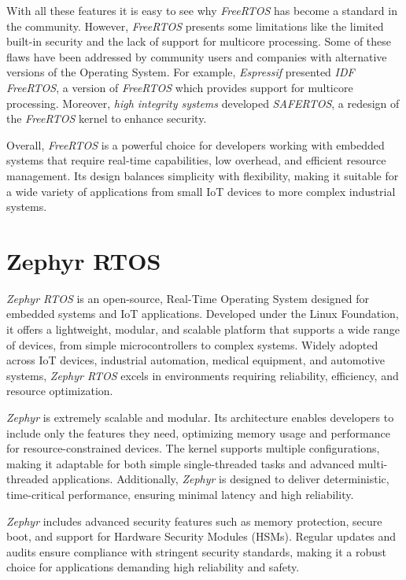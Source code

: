 With all these features it is easy to see why \textit{FreeRTOS} has become a standard
in the community. However, \textit{FreeRTOS} presents some limitations like the
limited built-in security and the lack of support for multicore processing. Some
of these flaws have been addressed by community users and companies with alternative
versions of the Operating System. For example, \textit{Espressif} presented
\textit{IDF FreeRTOS}\cite{idfrtos}, a version of \textit{FreeRTOS} which
provides support for multicore processing. Moreover, \textit{high integrity
systems} developed \textit{SAFERTOS}\cite{safertos}, a redesign of the \textit{FreeRTOS}
kernel to enhance security.

Overall, \textit{FreeRTOS} is a powerful choice for developers working with embedded
systems that require real-time capabilities, low overhead, and efficient resource
management. Its design balances simplicity with flexibility, making it suitable for
a wide variety of applications from small IoT devices to more complex industrial
systems.

\section{Zephyr RTOS}
\label{sec:rtos_zephyr}

\textit{Zephyr RTOS}\cite{zephyrtos} is an open-source, Real-Time Operating System
designed for embedded systems and IoT applications. Developed under the Linux
Foundation, it offers a lightweight, modular, and scalable platform that supports
a wide range of devices, from simple microcontrollers to complex systems. Widely
adopted across IoT devices, industrial automation, medical equipment, and
automotive systems, \textit{Zephyr RTOS} excels in environments requiring
reliability, efficiency, and resource optimization.

\textit{Zephyr} is extremely scalable and modular. Its architecture enables
developers to include only the features they need, optimizing memory usage and performance
for resource-constrained devices. The kernel supports multiple configurations, making
it adaptable for both simple single-threaded tasks and advanced multi-threaded applications.
Additionally, \textit{Zephyr} is designed to deliver deterministic, time-critical
performance, ensuring minimal latency and high reliability.

\textit{Zephyr} includes advanced security features such as memory protection,
secure boot, and support for Hardware Security Modules (HSMs). Regular updates
and audits ensure compliance with stringent security standards, making it a robust
choice for applications demanding high reliability and safety.

